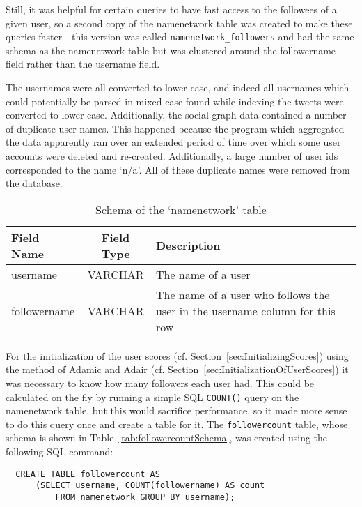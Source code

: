 Still, it was helpful for certain queries to have fast access to the followees of a given user, so a second copy of the namenetwork table was created to make these queries faster---this version was called \texttt{namenetwork\_followers} and had the same schema as the namenetwork table but was clustered around the followername field rather than the username field.

The usernames were all converted to lower case, and indeed all usernames which could potentially be parsed in mixed case found while indexing the tweets were converted to lower case. Additionally, the social graph data contained a number of duplicate user names. This happened because the program which aggregated the data apparently ran over an extended period of time over which some user accounts were deleted and re-created. Additionally, a large number of user ids corresponded to the name `n/a'. All of these duplicate names were removed from the database.

\begin{table}
\centering
\begin{tabular}{l|c|p{8cm}}
{\bf Field Name} & {\bf Field Type} & {\bf Description} \\ \hline
username & VARCHAR & The name of a user \\ \hline
followername & VARCHAR & The name of a user who follows the user in the username column for this row \\
\end{tabular}
\caption{Schema of the `namenetwork' table}
\label{tab:namenetworkSchema}
\end{table}


For the initialization of the user scores (cf. Section~\ref{sec:InitializingScores}) using the method of Adamic and Adair (cf. Section~\ref{sec:InitializationOfUserScores}) it was necessary to know how many followers each user had. This could be calculated on the fly by running a simple SQL \texttt{COUNT()} query on the namenetwork table, but this would sacrifice performance, so it made more sense to do this query once and create a table for it. The \texttt{followercount} table, whose schema is shown in Table~\ref{tab:followercountSchema}, was created using the following SQL command:

\begin{verbatim}
  CREATE TABLE followercount AS
      (SELECT username, COUNT(followername) AS count
          FROM namenetwork GROUP BY username);
\end{verbatim}

